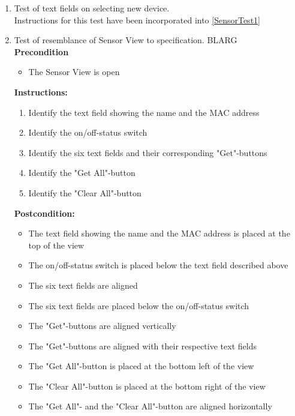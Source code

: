 \documentclass[a4paper]{article}
\newlength{\testlabellength}
\newenvironment{testlist}{\begin{enumerate}[label=\bfseries Instruction \thesubsection.\arabic* , labelindent=0pt, labelwidth=\testlabellength , leftmargin=2cm]}{\end{enumerate}}
\newenvironment{precondition}{
{\color{white}BLARG}\\ 
\textbf{Precondition}
\begin{itemize}[labelindent=0cm, labelwidth=2cm , leftmargin=1cm]
}
{\end{itemize}}
\newenvironment{instruction}{
\textbf{Instructions:}
\begin{enumerate}[label=\bfseries  \arabic*., labelindent=0cm, labelwidth=2cm , leftmargin=1cm]
}
{\end{enumerate}}
\newenvironment{postcondition}{
\textbf{Postcondition:}
\begin{itemize}[labelindent=0cm, labelwidth=2cm , leftmargin=1cm]
}
{\end{itemize}}
\begin{document}
\begin{appendices}
\begin{testlist}

	\item Test of text fields on selecting new device. \\
		Instructions for this test have been incorporated into \ref{SensorTest1}


	\item Test of resemblance of Sensor View to specification.
		\begin{precondition}
			\item The Sensor View is open
		\end{precondition}
		\begin{instruction}
			\item Identify the text field showing the name and the MAC address
			\item Identify the on/off-status switch
			\item Identify the six text fields and their corresponding "Get"-buttons
			\item Identify the "Get All"-button
			\item Identify the "Clear All"-button
		\end{instruction}
		\begin{postcondition}
			\item The text field showing the name and the MAC address is placed at the top of the view
			\item The on/off-status switch is placed below the text field described above
			\item The six text fields are aligned
			\item The six text fields are placed below the on/off-status switch
			\item The "Get"-buttons are aligned vertically
			\item The "Get"-buttons are aligned with their respective text fields
			\item The "Get All"-button is placed at the bottom left of the view
			\item The "Clear All"-button is placed at the bottom right of the view
			\item The "Get All"- and the "Clear All"-button are aligned horizontally
		\end{postcondition}
		

\end{testlist}
\end{appendices}
\end{document}
